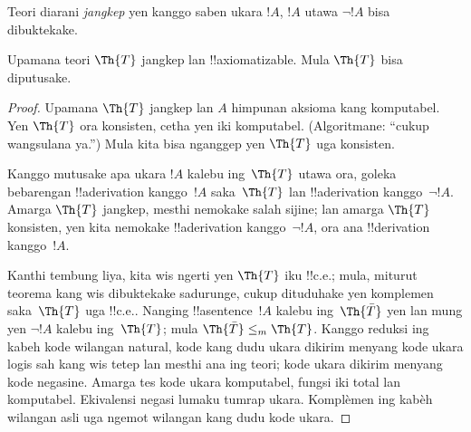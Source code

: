 \documentclass[../../../include/open-logic-section]{subfiles}
\begin{document}


Teori diarani {\em jangkep} yen kanggo saben ukara $!A$,
$!A$ utawa $\lnot !A$ bisa dibuktekake.

\begin{lem}
Upamana teori $\Th{T}$ jangkep lan !!{axiomatizable}. Mula
$\Th{T}$ bisa diputusake.
\end{lem}

\begin{proof}
Upamana $\Th{T}$ jangkep lan $A$ himpunan aksioma kang komputabel.
Yen $\Th{T}$ ora konsisten, cetha yen iki komputabel. (Algoritmane:
``cukup wangsulana ya.'') Mula kita bisa nganggep yen $\Th{T}$
uga konsisten.

Kanggo mutusake apa ukara $!A$ kalebu ing~$\Th{T}$ utawa ora,
goleka bebarengan !!a{derivation} kanggo~$!A$ saka~$\Th{T}$ lan
!!a{derivation} kanggo~$\lnot !A$. Amarga $\Th{T}$ jangkep, mesthi
nemokake salah sijine; lan amarga $\Th{T}$ konsisten, yen kita
nemokake !!a{derivation} kanggo~$\lnot !A$, ora ana !!{derivation} kanggo~$!A$.

Kanthi tembung liya, kita wis ngerti yen $\Th{T}$ iku !!{c.e.}; mula,
miturut teorema kang wis dibuktekake sadurunge, cukup dituduhake yen
komplemen saka~$\Th{T}$ uga !!{c.e.}. Nanging !!a{sentence}~$!A$ kalebu
ing~$\Th{\bar T}$ yen lan mung yen $\lnot !A$ kalebu ing~$\Th{T}$; mula
$\Th{\bar T} \leq_m \Th{T}$. Kanggo reduksi ing kabeh kode wilangan natural, kode kang dudu ukara dikirim menyang kode ukara logis sah kang wis tetep lan mesthi ana ing teori; kode ukara dikirim menyang kode negasine. Amarga tes kode ukara komputabel, fungsi iki total lan komputabel. Ekivalensi negasi lumaku tumrap ukara. Komplèmen ing kabèh wilangan asli uga ngemot wilangan kang dudu kode ukara.
\end{proof}
\end{document}
